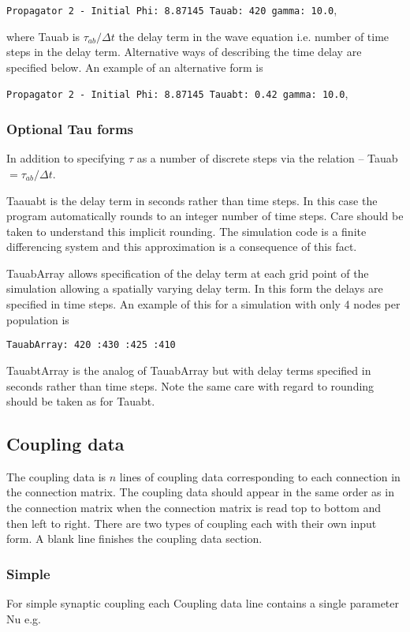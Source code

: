 \documentclass[12pt,a4paper]{article}
\begin{document}
{\tt \small Propagator 2 - Initial Phi: 8.87145 Tauab: 420 gamma: 10.0},

where Tauab is $\tau_{ab}/ \Delta t$ the delay term in the wave equation
i.e. number of time steps in the delay term. Alternative ways of describing
the time delay are specified below. An example of an alternative form is

{\tt \small Propagator 2 - Initial Phi: 8.87145 Tauabt: 0.42 gamma: 10.0},

\subsubsection{Optional Tau forms}

In addition to specifying $\tau$ as a number of discrete steps via the
relation -- Tauab $= \tau_{ab}/ \Delta t$.

Taauabt is the delay term in seconds rather than time steps.
In this case the program automatically rounds to an integer number
of time steps. Care should be taken to understand this implicit rounding.
The simulation code is a finite differencing system and this approximation
is a consequence of this fact.

TauabArray allows specification of the delay term at each grid point
of the simulation allowing a spatially varying delay term. In this form
the delays are specified in time steps. An example of this for a simulation
with only 4 nodes per population is

{\tt \small TauabArray: 420 :430 :425 :410}

TauabtArray is the analog of TauabArray but with delay terms specified in
seconds rather than time steps. Note the same care with regard to
rounding should be taken as for Tauabt.

\subsection{Coupling data}
The coupling data is $n$ lines of coupling data corresponding
to each connection in the connection matrix. The coupling data should appear
in the same order as in the connection matrix when the connection matrix is 
read top to bottom and then left to right. There are two types of coupling
each with their own input form.
A blank line finishes the coupling data section.

\subsubsection{Simple}
For simple synaptic coupling each Coupling data line contains a single parameter Nu e.g.
\end{document}
